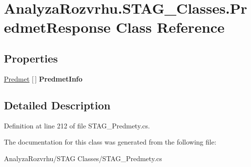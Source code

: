 \hypertarget{class_analyza_rozvrhu_1_1_s_t_a_g___classes_1_1_predmet_response}{}\section{Analyza\+Rozvrhu.\+S\+T\+A\+G\+\_\+\+Classes.\+Predmet\+Response Class Reference}
\label{class_analyza_rozvrhu_1_1_s_t_a_g___classes_1_1_predmet_response}
\subsection*{Properties}
\begin{DoxyCompactItemize}
\item 
\mbox{\label{class_analyza_rozvrhu_1_1_s_t_a_g___classes_1_1_predmet_response_a2e6399d2928c898f72777790f1de2c70}} 
\hyperlink{class_analyza_rozvrhu_1_1_s_t_a_g___classes_1_1_predmet}{Predmet} \mbox{[}$\,$\mbox{]} {\bfseries Predmet\+Info}
\end{DoxyCompactItemize}


\subsection{Detailed Description}


Definition at line 212 of file S\+T\+A\+G\+\_\+\+Predmety.\+cs.



The documentation for this class was generated from the following file\+:\begin{DoxyCompactItemize}
\item 
Analyza\+Rozvrhu/\+S\+T\+A\+G Classes/S\+T\+A\+G\+\_\+\+Predmety.\+cs\end{DoxyCompactItemize}
